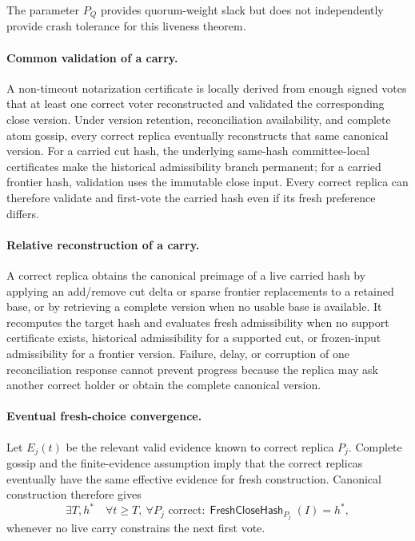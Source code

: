 \documentclass[sigplan,twocolumn,review,anonymous]{acmart}
\newcommand{\func}[1]{\operatorname{\mathsf{#1}}}
\newcommand{\FreshCloseHash}{\func{FreshCloseHash}}
\begin{document}
The parameter \(P_Q\) provides quorum-weight slack but does not independently provide crash tolerance for
this liveness theorem.

\paragraph{Common validation of a carry.}
A non-timeout notarization certificate is locally derived from enough signed votes that at least one
correct voter reconstructed and validated the corresponding close version.  Under version
retention, reconciliation availability, and complete atom gossip, every correct replica eventually
reconstructs that same canonical version.  For a carried cut hash, the underlying same-hash committee-local certificates make the historical
admissibility branch permanent; for a carried frontier hash, validation
uses the immutable close input.  Every correct replica can therefore validate and first-vote the carried
hash even if its fresh preference differs.

\paragraph{Relative reconstruction of a carry.}
A correct replica obtains the canonical preimage of a live carried hash by applying an add/remove cut
delta or sparse frontier replacements to a retained base, or by retrieving a complete version when no
usable base is available.  It recomputes the target hash and evaluates fresh admissibility when no
support certificate exists, historical admissibility for a supported cut, or frozen-input admissibility
for a frontier version.  Failure, delay, or corruption of one reconciliation response cannot prevent
progress because the replica may ask another correct holder or obtain the complete canonical version.

\paragraph{Eventual fresh-choice convergence.}
Let \(E_j(t)\) be the relevant valid evidence known to correct replica \(P_j\).  Complete gossip and
the finite-evidence assumption imply that the correct replicas eventually have the same effective
evidence for fresh construction.  Canonical construction therefore gives
\[
\exists T,h^\ast\quad
\forall t\ge T,\ \forall P_j\text{ correct}:
\FreshCloseHash_{P_j}(I)=h^\ast,
\]
whenever no live carry constrains the next first vote.
\end{document}
